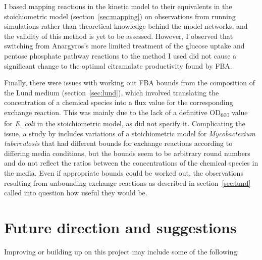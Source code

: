 \documentclass[parskip=full, numbers=noenddot]{scrreprt}
\begin{document}
I based mapping reactions in the kinetic model to their equivalents in the stoichiometric model (section~\ref{sec:mapping}) on observations from running simulations rather than theoretical knowledge behind the model networks, and the validity of this method is yet to be assessed. However, I observed that switching from Anargyros's more limited treatment of the glucose uptake and pentose phosphate pathway reactions to the method I used did not cause a significant change to the optimal citramalate productivity found by FBA.

Finally, there were issues with working out FBA bounds from the composition of the Lund medium (section~\ref{sec:lund}), which involved translating the concentration of a chemical species into a flux value for the corresponding exchange reaction. This was mainly due to the lack of a definitive OD\textsubscript{600} value for \emph{E. coli} in the stoichiometric model, as \citet{orth_comprehensive_2011} did not specify it. Complicating the issue, a study by \citet{kavvas_updated_2018} includes variations of a stoichiometric model for \emph{Mycobacterium tuberculosis} that had different bounds for exchange reactions according to differing media conditions, but the bounds seem to be arbitrary round numbers and do not reflect the ratios between the concentrations of the chemical species in the media. Even if appropriate bounds could be worked out, the observations resulting from unbounding exchange reactions as described in section~\ref{sec:lund} called into question how useful they would be.

\section{Future direction and suggestions}
\label{sec:future}

Improving or building up on this project may include some of the following:
\end{document}
